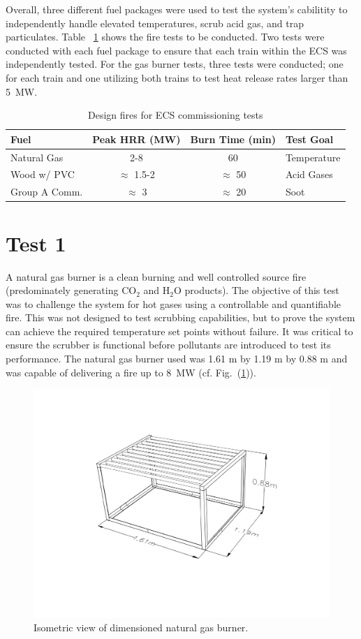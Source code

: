 \documentclass[12pt,oneside]{book}
\begin{document}
Overall, three different fuel packages were used to test the system's cabilitity to independently handle elevated temperatures, scrub acid gas, and trap particulates. Table ~\ref{tab:fires} shows the fire tests to be conducted. Two tests were conducted with each fuel package to ensure that each train within the ECS was independently tested. For the gas burner tests, three tests were conducted; one for each train and one utilizing both trains to test heat release rates larger than 5~MW.

\begin{table}[!h]
\centering
\caption{Design fires for ECS commissioning tests}
\label{tab:fires}
\begin{tabular}{lccl}
\toprule[1.5pt]
Fuel & Peak HRR (MW) & Burn Time (min) & Test Goal  \\
\midrule
Natural Gas   & 2-8             & 60            & Temperature  \\
Wood w/ PVC   & $\approx$ 1.5-2 & $\approx$ 50  & Acid Gases \\
Group A Comm. & $\approx$ 3     & $\approx$ 20  & Soot \\
\bottomrule[1.25pt]
\end{tabular}\par
\end{table}


\section{Test 1}
\label{test1}
A natural gas burner is a clean burning and well controlled source fire (predominately generating CO$_2$ and H$_2$O products). The objective of this test was to challenge the system for hot gases using a controllable and quantifiable fire. This was not designed to test scrubbing capabilities, but to prove the system can achieve the required temperature set points without failure. It was critical to ensure the scrubber is functional before pollutants are introduced to test its performance. The natural gas burner used was 1.61 m by 1.19 m by 0.88 m and was capable of delivering a fire up to 8~MW (cf. Fig.~(\ref{fig:nat_gas_burn})).

\begin{figure}
\centering
\includegraphics[width=.8\textwidth]{../Figures/Natural_Gas_Burner}
\caption {Isometric view of dimensioned natural gas burner.}
\label{fig:nat_gas_burn}
\end{figure}
\end{document}
